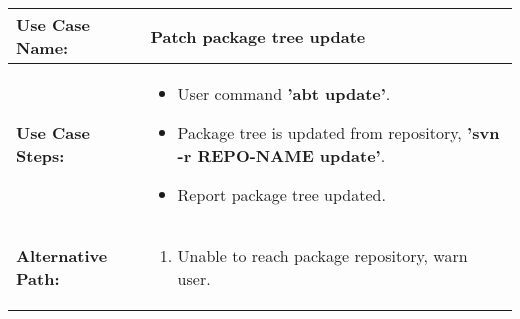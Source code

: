 \medskip

\begin{tabularx}{\linewidth}{|l|X|}
\hline
\textbf{Use Case Name:} & \textbf{Patch package tree update} \\
\hline
\textbf{Use Case Steps:} & 
\begin{minipage}{\linewidth} 
  \vspace{0.05em}
  \begin{itemize}
    \item User command \textbf{'abt update'}.
    \item Package tree is updated from repository, \textbf{'svn -r REPO-NAME update'}.
    \item Report package tree updated.
  \end{itemize}
  \vspace{0.05em}
\end{minipage}
\\
\hline 
\textbf{Alternative Path:} &
\begin{minipage}{\linewidth}
  \vspace{0.05em} 
  \begin{enumerate}
    \item Unable to reach package repository, warn user.
  \end{enumerate}
  \vspace{0.05em} 
\end{minipage}
\\
\hline
\end{tabularx}